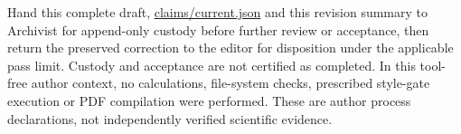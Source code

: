 \documentclass{article}
\begin{document}
Hand this complete draft, \url{claims/current.json} and this revision summary to Archivist for append-only custody before further review or acceptance, then return the preserved correction to the editor for disposition under the applicable pass limit. Custody and acceptance are not certified as completed. In this tool-free author context, no calculations, file-system checks, prescribed style-gate execution or PDF compilation were performed. These are author process declarations, not independently verified scientific evidence.
\end{document}
